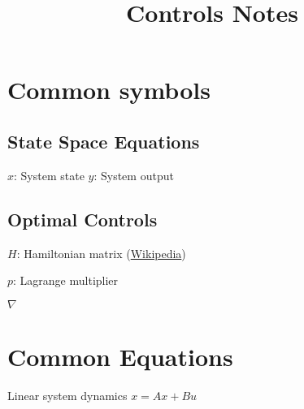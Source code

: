 \documentclass{article}
\title{Controls Notes}
\begin{document}
\maketitle

\section{Common symbols}

\subsection{State Space Equations}
$x$: System state
$y$: System output


\subsection{Optimal Controls}
\begin{itemize}
    


\begin{item}
$H$: Hamiltonian matrix (\href{http://www.overleaf.com}{Wikipedia})
\end{item}


\begin{item}
$p$: Lagrange multiplier
\end{item}



\begin{item}
$\nabla$
\end{item}


\end{itemize}

\section{Common Equations}

Linear system dynamics
$x=Ax+Bu$
\end{document}
